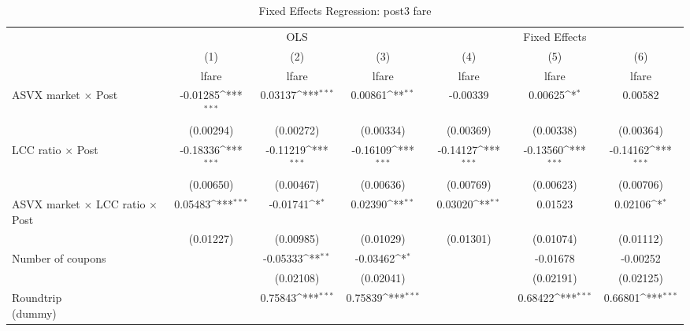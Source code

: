\begin{table}[htbp]\centering
\def\sym#1{\ifmmode^{#1}\else\(^{#1}\)\fi}
\caption{Fixed Effects Regression: post3 fare}
\begin{tabular}{l*{6}{c}}
\toprule
                    &\multicolumn{3}{c}{OLS}                                          &\multicolumn{3}{c}{Fixed Effects}                                \\\cmidrule(lr){2-4}\cmidrule(lr){5-7}
                    &\multicolumn{1}{c}{(1)}&\multicolumn{1}{c}{(2)}&\multicolumn{1}{c}{(3)}&\multicolumn{1}{c}{(4)}&\multicolumn{1}{c}{(5)}&\multicolumn{1}{c}{(6)}\\
                    &\multicolumn{1}{c}{lfare}&\multicolumn{1}{c}{lfare}&\multicolumn{1}{c}{lfare}&\multicolumn{1}{c}{lfare}&\multicolumn{1}{c}{lfare}&\multicolumn{1}{c}{lfare}\\
\midrule
ASVX market $\times$ Post&    -0.01285\sym{***}&     0.03137\sym{***}&     0.00861\sym{**} &    -0.00339         &     0.00625\sym{*}  &     0.00582         \\
                    &   (0.00294)         &   (0.00272)         &   (0.00334)         &   (0.00369)         &   (0.00338)         &   (0.00364)         \\
\addlinespace
LCC ratio $\times$ Post&    -0.18336\sym{***}&    -0.11219\sym{***}&    -0.16109\sym{***}&    -0.14127\sym{***}&    -0.13560\sym{***}&    -0.14162\sym{***}\\
                    &   (0.00650)         &   (0.00467)         &   (0.00636)         &   (0.00769)         &   (0.00623)         &   (0.00706)         \\
\addlinespace
ASVX market $\times$ LCC ratio $\times$ Post&     0.05483\sym{***}&    -0.01741\sym{*}  &     0.02390\sym{**} &     0.03020\sym{**} &     0.01523         &     0.02106\sym{*}  \\
                    &   (0.01227)         &   (0.00985)         &   (0.01029)         &   (0.01301)         &   (0.01074)         &   (0.01112)         \\
\addlinespace
Number of coupons   &                     &    -0.05333\sym{**} &    -0.03462\sym{*}  &                     &    -0.01678         &    -0.00252         \\
                    &                     &   (0.02108)         &   (0.02041)         &                     &   (0.02191)         &   (0.02125)         \\
\addlinespace
\shortstack{Roundtrip \\ (dummy)}&                     &     0.75843\sym{***}&     0.75839\sym{***}&                     &     0.68422\sym{***}&     0.66801\sym{***}\\

\end{tabular}
\end{table}

